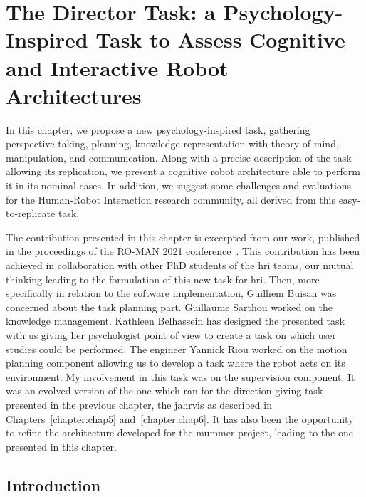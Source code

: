 \documentclass[a4paper,11pt,twoside]{StyleThese}
\begin{document}
	\setcounter{chapter}{8} %
	\dominitoc
	\faketableofcontents
	\fi

\chapter{The Director Task: a Psychology-Inspired Task to Assess Cognitive and Interactive Robot Architectures}
\label{chapter:chap9}
\minitoc

In this chapter, we propose a new psychology-inspired task, gathering perspective-taking, planning, knowledge representation with theory of mind, manipulation, and communication. Along with a precise description of the task allowing its replication, we present a cognitive robot architecture able to perform it in its nominal cases. In addition, we suggest some challenges and evaluations for the Human-Robot Interaction research community, all derived from this easy-to-replicate task.

The contribution presented in this chapter is excerpted from our work, published in the proceedings of the RO-MAN 2021 conference~\citep{sarthou_2021_director}. This contribution has been achieved in collaboration with other PhD students of the \acrshort{hri} teams, our mutual thinking leading to the formulation of this new task for \acrshort{hri}. Then, more specifically in relation to the software implementation, Guilhem Buisan was concerned about the task planning part. Guillaume Sarthou worked on the knowledge management. Kathleen Belhassein has designed the presented task with us giving her psychologist point of view to create a task on which user studies could be performed. The engineer Yannick Riou worked on the motion planning component allowing us to develop a task where the robot acts on its environment. My involvement in this task was on the supervision component. It was an evolved version of the one which ran for the direction-giving task presented in the previous chapter, \ie the \acrshort{jahrvis} as described in Chapters~\ref{chapter:chap5} and~\ref{chapter:chap6}. It has also been the opportunity to refine the architecture developed for the \acrshort{mummer} project, leading to the one presented in this chapter.


\section{Introduction}
\end{document}
